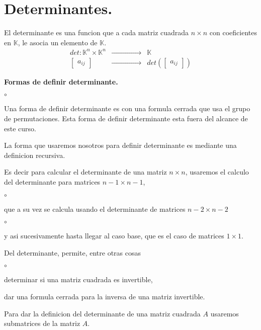 \documentclass{article}
\theoremstyle{definition}
\theoremstyle{definition}
\theoremstyle{remark}
\begin{document}
  \section{Determinantes.}
  El determinante es una funcion que a cada matriz cuadrada $n \times n$ con coeficientes en $\mathbb{K}$, le asocia un elemento de $\mathbb{K}$. \[
    \begin{array}{ccc} 
      det : \mathbb{K}^n \times \mathbb{K}^{n} & \xrightarrow{\quad\quad\quad\quad\quad\quad} & \mathbb{K} \\
      \begin{bmatrix}a_{ij}\end{bmatrix} & \xrightarrow{\quad\quad\quad\quad\quad\quad} & det\left(\begin{bmatrix}a_{ij}\end{bmatrix}\right) 
    \end{array}
  \]
\begin{center}
\textbf{Formas de definir determinante.}
\end{center}
\begin{list}{$\circ$}{}  
\item  Una forma de definir determinante es con una formula cerrada que usa el grupo de permutaciones. Esta forma de definir determinante esta fuera del alcance de este curso.
\item La forma que usaremos nosotros para definir determinante es mediante una definicion recursiva.
\item Es decir para calcular el determinante de una matriz $n \times n$, usaremos el calculo del determinante para matrices $n-1 \times n-1$,
\begin{list}{$\circ$}{}  
\item que a su vez se calcula usando el determinante de matrices $n-2\times n-2$
\begin{list}{$\circ$}{}  
\item y asi sucesivamente hasta llegar al caso base, que es el caso de matrices $1 \times 1$.
\end{list}
\end{list}
\end{list}
Del determinante, permite, entre otras cosas
\begin{list}{$\circ$}{}  
\item determinar si una matriz cuadrada es invertible,
\item dar una formula cerrada para la inversa de una matriz invertible.
\end{list}
Para dar la definicion del determinante de una matriz cuadrada $A$ usaremos submatrices de la matriz $A$.
\pagebreak
\end{document}

